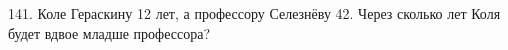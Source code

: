 141. Коле Гераскину 12 лет, а профессору Селезнёву 42. Через сколько лет Коля будет вдвое младше профессора?\\
